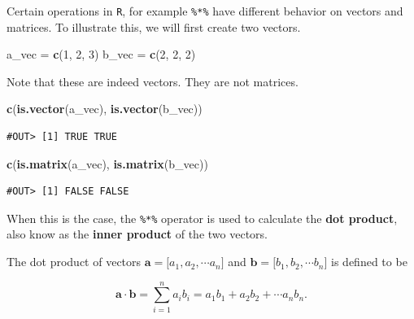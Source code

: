 \documentclass[]{book}
\newenvironment{Shaded}{\begin{snugshade}}{\end{snugshade}}
\newcommand{\KeywordTok}[1]{\textcolor[rgb]{0.13,0.29,0.53}{\textbf{#1}}}
\newcommand{\DecValTok}[1]{\textcolor[rgb]{0.00,0.00,0.81}{#1}}
\newcommand{\StringTok}[1]{\textcolor[rgb]{0.31,0.60,0.02}{#1}}
\newcommand{\CommentTok}[1]{\textcolor[rgb]{0.56,0.35,0.01}{\textit{#1}}}
\newcommand{\OperatorTok}[1]{\textcolor[rgb]{0.81,0.36,0.00}{\textbf{#1}}}
\newcommand{\NormalTok}[1]{#1}
\theoremstyle{definition}
\theoremstyle{definition}
\theoremstyle{definition}
\theoremstyle{remark}
\begin{document}
Certain operations in \texttt{R}, for example \texttt{\%*\%} have
different behavior on vectors and matrices. To illustrate this, we will
first create two vectors.

\begin{Shaded}
\begin{Highlighting}[]
\NormalTok{a_vec =}\StringTok{ }\KeywordTok{c}\NormalTok{(}\DecValTok{1}\NormalTok{, }\DecValTok{2}\NormalTok{, }\DecValTok{3}\NormalTok{)}
\NormalTok{b_vec =}\StringTok{ }\KeywordTok{c}\NormalTok{(}\DecValTok{2}\NormalTok{, }\DecValTok{2}\NormalTok{, }\DecValTok{2}\NormalTok{)}
\end{Highlighting}
\end{Shaded}

Note that these are indeed vectors. They are not matrices.

\begin{Shaded}
\begin{Highlighting}[]
\KeywordTok{c}\NormalTok{(}\KeywordTok{is.vector}\NormalTok{(a_vec), }\KeywordTok{is.vector}\NormalTok{(b_vec))}
\end{Highlighting}
\end{Shaded}

\begin{verbatim}
#OUT> [1] TRUE TRUE
\end{verbatim}

\begin{Shaded}
\begin{Highlighting}[]
\KeywordTok{c}\NormalTok{(}\KeywordTok{is.matrix}\NormalTok{(a_vec), }\KeywordTok{is.matrix}\NormalTok{(b_vec))}
\end{Highlighting}
\end{Shaded}

\begin{verbatim}
#OUT> [1] FALSE FALSE
\end{verbatim}

When this is the case, the \texttt{\%*\%} operator is used to calculate
the \textbf{dot product}, also know as the \textbf{inner product} of the
two vectors.

The dot product of vectors
\(\boldsymbol{a} = \lbrack a_1, a_2, \cdots a_n \rbrack\) and
\(\boldsymbol{b} = \lbrack b_1, b_2, \cdots b_n \rbrack\) is defined to
be

\[
\boldsymbol{a} \cdot \boldsymbol{b} = \sum_{i = 1}^{n} a_i b_i = a_1 b_1 + a_2 b_2 + \cdots a_n b_n.
\]

\begin{Shaded}
\end{Shaded}
\end{document}
